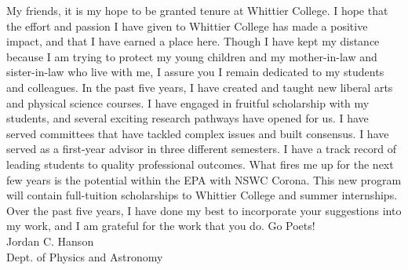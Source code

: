 \documentclass[../../main.tex]{subfiles}
\begin{document}
My friends, it is my hope to be granted tenure at Whittier College.  I hope that the effort and passion I have given to Whittier College has made a positive impact, and that I have earned a place here.  Though I have kept my distance because I am trying to protect my young children and my mother-in-law and sister-in-law who live with me, I assure you I remain dedicated to my students and colleagues.  In the past five years, I have created and taught new liberal arts and physical science courses.  I have engaged in fruitful scholarship with my students, and several exciting research pathways have opened for us.  I have served committees that have tackled complex issues and built consensus.  I have served as a first-year advisor in three different semesters.  I have a track record of leading students to quality professional outcomes.  What fires me up for the next few years is the potential within the EPA with NSWC Corona.  This new program will contain full-tuition scholarships to Whittier College and summer internships.  Over the past five years, I have done my best to incorporate your suggestions into my work, and I am grateful for the work that you do. Go Poets!
\\
\vspace{0.35cm}
Jordan C. Hanson \\ Dept. of Physics and Astronomy
\end{document}
